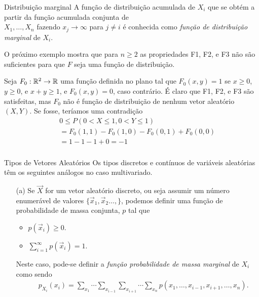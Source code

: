 \begin{frame}
\begin{block}{Distribuição marginal}
A função de distribuição acumulada de $X_i$ que se obtém a partir da função acumulada conjunta de\\ $X_1,\ldots,X_n$ fazendo
$x_j\rightarrow\infty$ para $j\ne i$ é conhecida como {\em função de distribuição marginal} de $X_i$.
\end{block}

O próximo exemplo mostra que para $n\geq 2$ as propriedades F1, F2, e F3 não são suficientes para que $F$ seja uma função de distribuição.

\begin{exem}
Seja $F_0:\mathbb{R}^2 \rightarrow\mathbb{R}$ uma função definida no plano tal que $F_0(x,y)=1$ se $x\geq 0$, $y\geq 0$, e $x+y\geq 1$, e $F_0(x,y)=0$, caso contrário. É claro que F1, F2, e F3 são satisfeitas, mas $F_0$ não é função de distribuição de nenhum vetor aleatório $(X,Y)$. Se fosse, teríamos uma contradição
\begin{eqnarray}
& & 0\leq P(0 <X\leq 1,0<Y\leq 1)\nonumber\\
& & =F_0(1,1)-F_0(1,0)-F_0(0,1)+F_0(0,0)\nonumber \\
& & =1-1-1+0=-1 \nonumber
\end{eqnarray}
\end{exem}
\end{frame}

\begin{frame}
\frametitle{}
\begin{block}{Tipos de Vetores Aleatórios}
Os tipos discretos e contínuos de variáveis aleatórias têm os seguintes análogos no caso multivariado.
\begin{enumerate}
\item[(a)] Se $\vec{X}$ for um vetor aleatório discreto, ou seja assumir um
número enumerável de valores $\{\vec{x}_1,\vec{x}_2\ldots,\}$,
podemos definir uma função de probabilidade de massa conjunta, $p$
tal que
\begin{itemize}
\item $p(\vec{x}_i)\geq 0$.
\item $\sum_{i=1}^{\infty}p(\vec{x}_i)=1$.
\end{itemize}
Neste caso, pode-se definir a {\em função probabilidade de massa marginal} de $X_i$ como sendo
\begin{eqnarray}
& & p_{X_i}(x_i)= \sum_{x_1}\cdots\sum_{x_{i-1}}\sum_{x_{i+1}}\cdots\sum_{x_n}p(x_1,\ldots,x_{i-1},x_{i+1},\ldots,x_n).\nonumber
\end{eqnarray}
\end{enumerate}
\end{block}
\end{frame}

